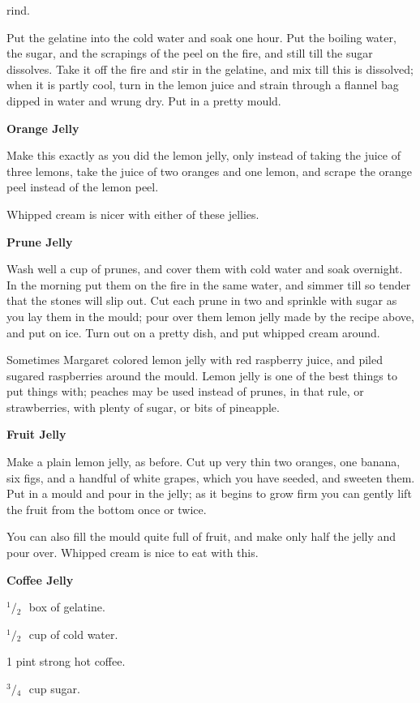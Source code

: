 \documentclass[11pt]{book}
\newcommand{\indpar}{\par\noindent\hspace*{\parindent}}
\newcommand{\ingredient}{\indpar}
\newcommand{\instruction}{\indpar}
\newcommand{\OneHalf}{\ensuremath{{}^1\!\!/\!{}_2\mbox{\ }}}
\newcommand{\ThreeQuarters}{\ensuremath{{}^3\!\!/\!{}_4\mbox{\ }}}
\newenvironment{RecipeTitle}{\medskip\begin{center}\large\bf }{\end{center}\smallskip}
\begin{document}
rind.
\instruction  Put the gelatine into the cold water and soak one hour.  Put
the boiling water, the sugar, and the scrapings of the peel on
the fire, and still till the sugar dissolves.  Take it off the
fire and stir in the gelatine, and mix till this is dissolved;
when it is partly cool, turn in the lemon juice and strain
through a flannel bag dipped in water and wrung dry.  Put in a
pretty mould.
\begin{RecipeTitle}
Orange Jelly\label{orange_jelly}
\end{RecipeTitle}
\instruction  Make this exactly as you did the lemon jelly, only instead
of taking the juice of three lemons, take the juice of two
oranges and one lemon, and scrape the orange peel instead of
the lemon peel.
\instruction  Whipped cream is nicer with either of these jellies.
\begin{RecipeTitle}
Prune Jelly\label{prune_jelly}
\end{RecipeTitle}
\instruction  Wash well a cup of prunes, and cover them with cold water
and soak overnight.  In the morning put them on the fire in
the same water, and simmer till so tender that the stones will
slip out.  Cut each prune in two and sprinkle with sugar as
you lay them in the mould; pour over them lemon jelly made by
the recipe above, and put on ice.  Turn out on a pretty dish,
and put whipped cream around.
\bigskip
\indpar
  Sometimes Margaret colored lemon jelly with red raspberry
juice, and piled sugared raspberries around the mould.  Lemon
jelly is one of the best things to put things with; peaches
may be used instead of prunes, in that rule, or strawberries,
with plenty of sugar, or bits of pineapple.
\begin{RecipeTitle}
Fruit Jelly\label{fruit_jelly}
\end{RecipeTitle}
\instruction  Make a plain lemon jelly, as before.  Cut up very thin two
oranges, one banana, six figs, and a handful of white grapes,
which you have seeded, and sweeten them.  Put in a mould and
pour in the jelly; as it begins to grow firm you can gently
lift the fruit from the bottom once or twice.
\instruction  You can also fill the mould quite full of fruit, and make
only half the jelly and pour over.  Whipped cream is nice to
eat with this.
\begin{RecipeTitle}
Coffee Jelly\label{coffee_jelly}
\end{RecipeTitle}
\ingredient  \OneHalf box of gelatine.
\ingredient  \OneHalf cup of cold water.
\ingredient  1 pint strong hot coffee.
\ingredient  \ThreeQuarters cup sugar.
\end{document}
